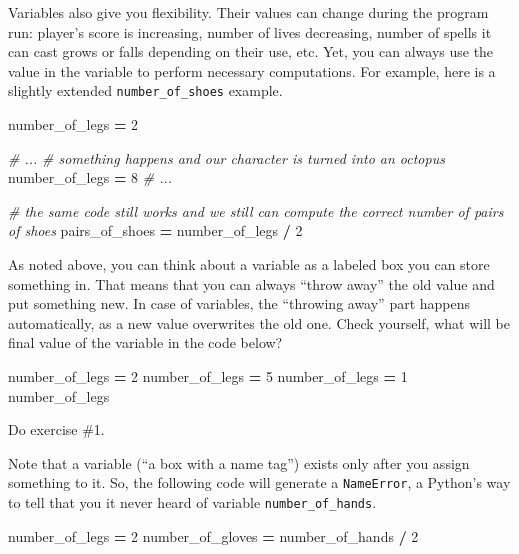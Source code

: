 \documentclass[
]{book}
\newenvironment{Shaded}{\begin{snugshade}}{\end{snugshade}}
\newcommand{\CommentTok}[1]{\textcolor[rgb]{0.56,0.35,0.01}{\textit{#1}}}
\newcommand{\DecValTok}[1]{\textcolor[rgb]{0.00,0.00,0.81}{#1}}
\newcommand{\NormalTok}[1]{#1}
\newcommand{\OperatorTok}[1]{\textcolor[rgb]{0.81,0.36,0.00}{\textbf{#1}}}
\begin{document}
Variables also give you flexibility. Their values can change during the program run: player's score is increasing, number of lives decreasing, number of spells it can cast grows or falls depending on their use, etc. Yet, you can always use the value in the variable to perform necessary computations. For example, here is a slightly extended \texttt{number\_of\_shoes} example.

\begin{Shaded}
\begin{Highlighting}[]
\NormalTok{number\_of\_legs }\OperatorTok{=} \DecValTok{2}

\CommentTok{\# ...}
\CommentTok{\# something happens and our character is turned into an octopus}
\NormalTok{number\_of\_legs }\OperatorTok{=} \DecValTok{8}
\CommentTok{\# ...}

\CommentTok{\# the same code still works and we still can compute the correct number of pairs of shoes}
\NormalTok{pairs\_of\_shoes }\OperatorTok{=}\NormalTok{ number\_of\_legs }\OperatorTok{/} \DecValTok{2}
\end{Highlighting}
\end{Shaded}

As noted above, you can think about a variable as a labeled box you can store something in. That means that you can always ``throw away'' the old value and put something new. In case of variables, the ``throwing away'' part happens automatically, as a new value overwrites the old one. Check yourself, what will be final value of the variable in the code below?

\begin{Shaded}
\begin{Highlighting}[]
\NormalTok{number\_of\_legs }\OperatorTok{=} \DecValTok{2}
\NormalTok{number\_of\_legs }\OperatorTok{=} \DecValTok{5}
\NormalTok{number\_of\_legs }\OperatorTok{=} \DecValTok{1}
\NormalTok{number\_of\_legs}
\end{Highlighting}
\end{Shaded}

Do exercise \#1.

Note that a variable (``a box with a name tag'') exists only after you assign something to it. So, the following code will generate a \texttt{NameError}, a Python's way to tell that you it never heard of variable \texttt{number\_of\_hands}.

\begin{Shaded}
\begin{Highlighting}[]
\NormalTok{number\_of\_legs }\OperatorTok{=} \DecValTok{2}
\NormalTok{number\_of\_gloves }\OperatorTok{=}\NormalTok{ number\_of\_hands }\OperatorTok{/} \DecValTok{2}
\end{Highlighting}
\end{Shaded}
\end{document}
